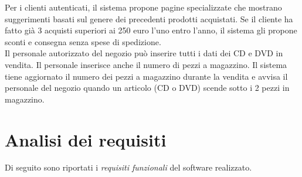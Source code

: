 \documentclass[a4paper,12pt]{report}
\begin{document}
{	Per i clienti autenticati, il sistema propone pagine specializzate che mostrano suggerimenti basati sul genere dei precedenti prodotti acquistati. Se il cliente ha fatto già 3 acquisti superiori ai 250 euro l’uno entro l’anno, il sistema gli propone sconti e consegna senza spese di spedizione.\\	
	Il personale autorizzato del negozio può inserire tutti i dati dei CD e DVD in vendita. Il personale
	inserisce anche il numero di pezzi a magazzino. Il sistema tiene aggiornato il numero dei pezzi a
	magazzino durante la vendita e avvisa il personale del negozio quando un articolo (CD o DVD) scende sotto i 2 pezzi in magazzino.}
	
	
	
	\chapter*{Analisi dei requisiti}
	Di seguito sono riportati i \textit{requisiti funzionali} del software realizzato.
	
\end{document}
